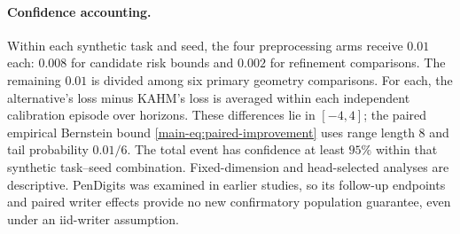 \paragraph{Confidence accounting.}
Within each synthetic task and seed, the four preprocessing arms receive
$0.01$ each: $0.008$ for candidate risk bounds and $0.002$ for refinement
comparisons. The remaining $0.01$ is divided among six primary geometry
comparisons. For each, the alternative's loss minus KAHM's loss is averaged
within each independent calibration episode over horizons. These differences
lie in $[-4,4]$; the paired empirical Bernstein bound
\eqref{main-eq:paired-improvement} uses range length $8$ and tail probability
$0.01/6$. The total event has confidence at least $95\%$ within that
synthetic task--seed combination. Fixed-dimension and head-selected analyses
are descriptive. PenDigits was examined in earlier studies, so its follow-up
endpoints and paired writer effects provide no new confirmatory population
guarantee, even under an iid-writer assumption.

